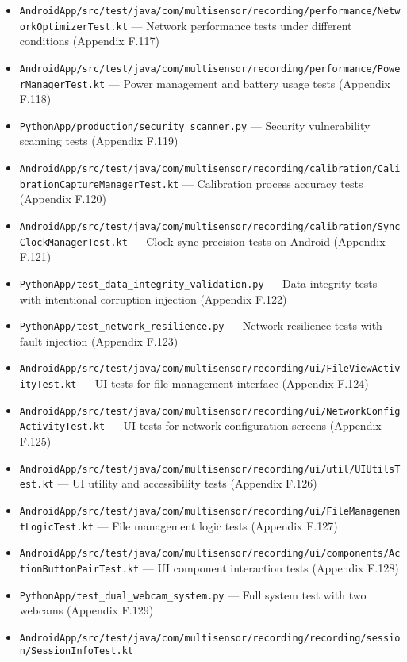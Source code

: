 \documentclass[11pt,a4paper]{report}
\begin{document}
{{\begin{itemize}
\item \texttt{AndroidApp/src/test/java/com/multisensor/recording/performance/NetworkOptimizerTest.kt}
  --- Network performance tests under different conditions (Appendix
  F.117)
\item \texttt{AndroidApp/src/test/java/com/multisensor/recording/performance/PowerManagerTest.kt}
  --- Power management and battery usage tests (Appendix F.118)
\item \texttt{PythonApp/production/security\_scanner.py} --- Security vulnerability
  scanning tests (Appendix F.119)
\item \texttt{AndroidApp/src/test/java/com/multisensor/recording/calibration/CalibrationCaptureManagerTest.kt}
  --- Calibration process accuracy tests (Appendix F.120)
\item \texttt{AndroidApp/src/test/java/com/multisensor/recording/calibration/SyncClockManagerTest.kt}
  --- Clock sync precision tests on Android (Appendix F.121)
\item \texttt{PythonApp/test\_data\_integrity\_validation.py} --- Data integrity tests
  with intentional corruption injection (Appendix F.122)
\item \texttt{PythonApp/test\_network\_resilience.py} --- Network resilience tests
  with fault injection (Appendix F.123)
\item \texttt{AndroidApp/src/test/java/com/multisensor/recording/ui/FileViewActivityTest.kt}
  --- UI tests for file management interface (Appendix F.124)
\item \texttt{AndroidApp/src/test/java/com/multisensor/recording/ui/NetworkConfigActivityTest.kt}
  --- UI tests for network configuration screens (Appendix F.125)
\item \texttt{AndroidApp/src/test/java/com/multisensor/recording/ui/util/UIUtilsTest.kt}
  --- UI utility and accessibility tests (Appendix F.126)
\item \texttt{AndroidApp/src/test/java/com/multisensor/recording/ui/FileManagementLogicTest.kt}
  --- File management logic tests (Appendix F.127)
\item \texttt{AndroidApp/src/test/java/com/multisensor/recording/ui/components/ActionButtonPairTest.kt}
  --- UI component interaction tests (Appendix F.128)
\item \texttt{PythonApp/test\_dual\_webcam\_system.py} --- Full system test with two
  webcams (Appendix F.129)
\item \texttt{AndroidApp/src/test/java/com/multisensor/recording/recording/session/SessionInfoTest.kt}

\end{itemize}}}
\end{document}
